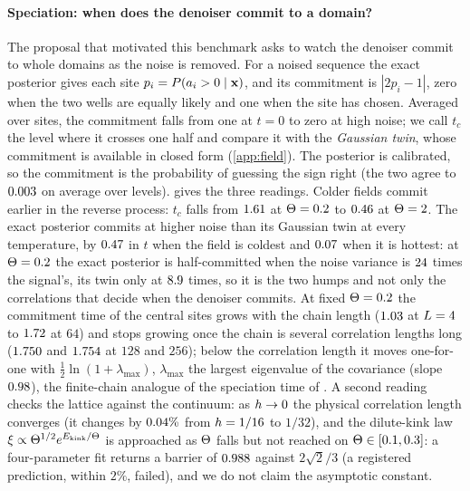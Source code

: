 \paragraph{Speciation: when does the denoiser commit to a domain?}
The proposal that motivated this benchmark asks to watch the denoiser commit to whole domains as the noise is
removed. For a noised sequence the exact posterior gives each site $p_i=P(a_i>0\mid\mathbf{x})$, and its commitment is
$|2p_i-1|$, zero when the two wells are equally likely and one when the site has chosen. Averaged over sites, the
commitment falls from one at $t=0$ to zero at high noise; we call $t_c$ the level where it crosses one half and
compare it with the \emph{Gaussian twin}, whose commitment is available in closed form (\cref{app:field}). The
posterior is calibrated, so the commitment is the probability of guessing the sign right (the two agree to
$0.003$ on average over levels).  gives the three readings. Colder fields commit
earlier in the reverse process: $t_c$ falls from $1.61$ at $\Theta=0.2$ to $0.46$ at $\Theta=2$. The
exact posterior commits at higher noise than its Gaussian twin at every temperature, by $0.47$ in $t$
when the field is coldest and $0.07$ when it is hottest: at $\Theta=0.2$ the exact posterior is
half-committed when the noise variance is $24$ times the signal's, its twin only at
$8.9$ times, so it is the two humps and not only the correlations that decide when the
denoiser commits. At fixed $\Theta=0.2$ the commitment time of the central sites grows with the chain length
($1.03$ at $L=4$ to $1.72$ at $64$) and stops growing once the chain is several
correlation lengths long ($1.750$ and $1.754$ at $128$ and $256$); below the
correlation length it moves one-for-one with $\tfrac12\ln(1+\lambda_{\max})$, $\lambda_{\max}$ the largest eigenvalue of
the covariance (slope $0.98$), the finite-chain analogue of the speciation time of
\citet{biroli2024dynamical}. A second reading checks the lattice against the continuum: as $h\to0$ the physical
correlation length converges (it changes by $0.04\%$ from $h=1/16$ to $1/32$), and the dilute-kink law
$\xi\propto\Theta^{1/2}e^{E_{\mathrm{kink}}/\Theta}$ is approached as $\Theta$ falls but not reached on $\Theta\in[0.1,0.3]$: a
four-parameter fit returns a barrier of $0.988$ against $2\sqrt2/3$ (a registered prediction, within $2\%$, failed),
and we do not claim the asymptotic constant.

